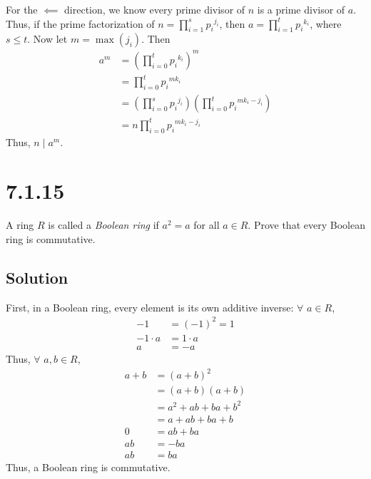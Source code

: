\documentclass[fleqn]{article}
\begin{document}
            For the $\impliedby$ direction, we know every prime divisor of $n$ is a prime divisor of $a$.  Thus, if the prime factorization of $n = \prod\limits_{i = 1}^{s} {p_i}^{j_i}$, then $a = \prod\limits_{i = 1}^{t} {p_i}^{k_i}$, where $s \leq t$.  Now let $m = \max(j_i)$.  Then
            \begin{align}
                a^m &= \left(\prod\limits_{i = 0}^{t} {p_i}^{k_i}\right)^m \\
                    &= \prod\limits_{i = 0}^{t} {p_i}^{m k_i} \\
                    &= \left(\prod\limits_{i = 0}^{s} {p_i}^{j_i}\right)\left(\prod\limits_{i = 0}^{t} {p_i}^{m k_i - j_i}\right) \\
                    &= n \prod\limits_{i = 0}^{t} {p_i}^{m k_i - j_i}
            \end{align}
            Thus, $n \mid a^m$.
    
    \section{7.1.15}
    A ring $R$ is called a \textit{Boolean ring} if $a^2 = a$ for all $a \in R$.  Prove that every Boolean ring is commutative.
        
        \subsection{Solution}
        First, in a Boolean ring, every element is its own additive inverse: $\forall$ $a \in R$,
        \begin{align}
            -1 &= (-1)^2 = 1 \\
            -1 \cdot a &= 1 \cdot a \\
            a &= -a
        \end{align}
        Thus, $\forall$ $a, b \in R$,
        \begin{align}
            a + b &= (a + b)^2 \\
                &= (a + b)(a + b) \\
                &= a^2 + ab + ba + b^2 \\
                &= a + ab + ba + b \\
            0 &= ab + ba \\
            ab &= -ba \\
            ab &= ba
        \end{align}
        Thus, a Boolean ring is commutative.
        
\end{document}
